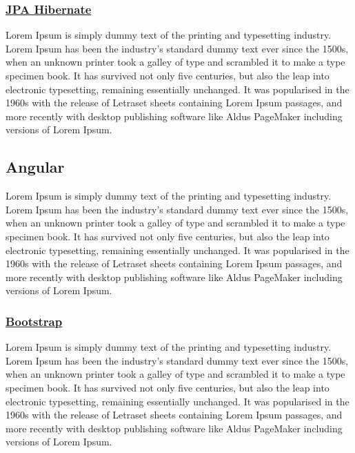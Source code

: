         \subsubsection{\underline{JPA Hibernate}}
        Lorem Ipsum is simply dummy text of the printing and typesetting industry. Lorem Ipsum has been the industry's standard dummy text ever since the 1500s, when an unknown printer took a galley of type and scrambled it to make a type specimen book. It has survived not only five centuries, but also the leap into electronic typesetting, remaining essentially unchanged. It was popularised in the 1960s with the release of Letraset sheets containing Lorem Ipsum passages, and more recently with desktop publishing software like Aldus PageMaker including versions of Lorem Ipsum.
        
     \subsection{Angular}
       Lorem Ipsum is simply dummy text of the printing and typesetting industry. Lorem Ipsum has been the industry's standard dummy text ever since the 1500s, when an unknown printer took a galley of type and scrambled it to make a type specimen book. It has survived not only five centuries, but also the leap into electronic typesetting, remaining essentially unchanged. It was popularised in the 1960s with the release of Letraset sheets containing Lorem Ipsum passages, and more recently with desktop publishing software like Aldus PageMaker including versions of Lorem Ipsum.

        \subsubsection{\underline{Bootstrap}}
         Lorem Ipsum is simply dummy text of the printing and typesetting industry. Lorem Ipsum has been the industry's standard dummy text ever since the 1500s, when an unknown printer took a galley of type and scrambled it to make a type specimen book. It has survived not only five centuries, but also the leap into electronic typesetting, remaining essentially unchanged. It was popularised in the 1960s with the release of Letraset sheets containing Lorem Ipsum passages, and more recently with desktop publishing software like Aldus PageMaker including versions of Lorem Ipsum.

   
     